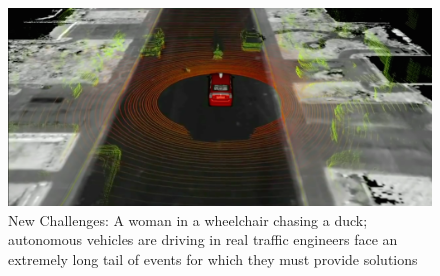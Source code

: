  \begin{figure}
 	\includegraphics[width=\columnwidth]{figures/duck.png}
 	\caption{New Challenges: A woman in a wheelchair chasing a duck; autonomous vehicles are driving in real traffic engineers face an extremely long tail of events for which they must provide solutions}
 \end{figure}
 
 
 
 
